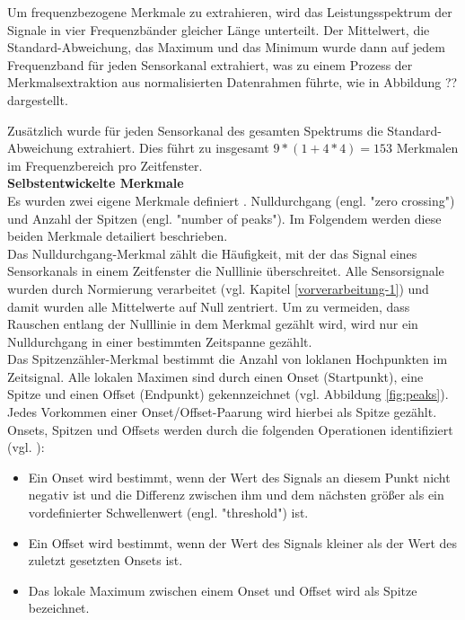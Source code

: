 Um frequenzbezogene Merkmale zu extrahieren, wird das Leistungsspektrum der Signale in vier Frequenzbänder gleicher Länge unterteilt.
Der Mittelwert, die Standard-Abweichung, das Maximum und das Minimum wurde dann auf jedem Frequenzband für jeden Sensorkanal extrahiert, was zu einem Prozess der Merkmalsextraktion aus normalisierten Datenrahmen führte, wie in Abbildung ?? dargestellt.

Zusätzlich wurde für jeden Sensorkanal des gesamten Spektrums die Standard-Abweichung  extrahiert. Dies führt zu insgesamt $9 \ast (1 + 4 \ast 4) = 153$ Merkmalen im Frequenzbereich pro Zeitfenster. \\


\textbf{Selbstentwickelte Merkmale \\}
Es wurden zwei eigene Merkmale definiert \cite{bscpiet}. Nulldurchgang (engl. "zero crossing") und Anzahl der Spitzen (engl. "number of peaks"). Im Folgendem werden diese beiden Merkmale detailiert beschrieben. \\

Das Nulldurchgang-Merkmal zählt die Häufigkeit, mit der das Signal eines Sensorkanals in einem Zeitfenster die Nulllinie überschreitet.
Alle Sensorsignale wurden durch Normierung verarbeitet (vgl. Kapitel \ref{vorverarbeitung-1}) und damit wurden alle Mittelwerte auf Null zentriert.
Um zu vermeiden, dass Rauschen entlang der Nulllinie in dem Merkmal gezählt wird, wird nur ein Nulldurchgang in einer bestimmten Zeitspanne gezählt. \\


Das Spitzenzähler-Merkmal bestimmt die Anzahl von loklanen Hochpunkten im Zeitsignal.
Alle lokalen Maximen sind durch einen Onset (Startpunkt), eine Spitze und einen Offset (Endpunkt) gekennzeichnet (vgl. Abbildung \ref{fig:peaks}). 
Jedes Vorkommen einer Onset/Offset-Paarung wird hierbei als Spitze gezählt.
Onsets, Spitzen und Offsets werden durch die folgenden Operationen identifiziert (vgl. \cite{bscGouverneur}):

\begin{itemize} %
  \item Ein Onset wird bestimmt, wenn der Wert des Signals an diesem Punkt nicht negativ ist und die Differenz zwischen ihm und dem nächsten größer als ein vordefinierter Schwellenwert (engl. "threshold") ist.

  \item Ein Offset wird bestimmt, wenn der Wert des Signals kleiner als der Wert des zuletzt gesetzten Onsets ist.

  \item Das lokale Maximum zwischen einem Onset und Offset wird als Spitze bezeichnet.
\end{itemize} \vspace{0.2cm}


